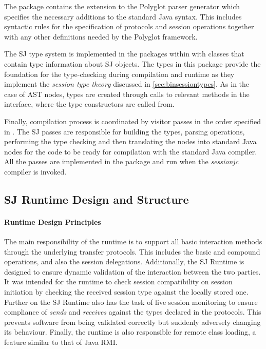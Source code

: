 The package  contains the extension to the Polyglot parser generator which specifies the necessary additions to the standard Java syntax. This includes syntactic rules for the specification of protocols and session operations together with any other definitions needed by the Polyglot framework.

The SJ type system is implemented in the packages within  with classes that contain type information about SJ objects. The types in this package provide the foundation for the type-checking during compilation and runtime as they implement the \textit{session type theory} discussed in \autoref{sec:binsessiontypes}. As in the case of AST nodes, types are created through calls to relevant methods in the  interface, where the type constructors are called from.

Finally, compilation process is coordinated by visitor passes in the order specified in . The SJ passes are responsible for building the types, parsing operations, performing the type checking and then translating the nodes into standard Java nodes for the code to be ready for compilation with the standard Java compiler. All the passes are implemented in the  package and run when the \textit{sessionjc} compiler is invoked.


\subsection{SJ Runtime Design and Structure}
\label{subsec:sjrun}

\paragraph*{Runtime Design Principles}
The main responsibility of the runtime is to support all basic interaction methods through the underlying transfer protocols. This includes the basic and compound operations, and also the session delegations. Additionally, the SJ Runtime is designed to ensure dynamic validation of the interaction between the two parties. It was intended for the runtime to check session compatibility on session initiation by checking the received session type against the locally stored one. Further on the SJ Runtime also has the task of live session monitoring to ensure compliance of \textit{sends} and \textit{receives} against the types declared in the protocols. This prevents software from being validated correctly but suddenly adversely changing its behaviour. Finally, the runtime is also responsible for remote class loading, a feature similar to that of Java RMI. 

